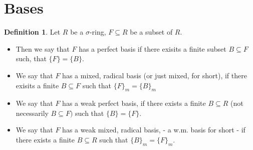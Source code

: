 \documentclass{article}
\def\s{\sigma}
\theoremstyle{definition}
\newtheorem{defn}[Satz]{Definition}
\begin{document}
\section{Bases}
\begin{defn}
Let $R$ be a $\s$-ring, $F \subseteq R$ be a subset of $R$. 
\begin{itemize}
\item Then we say that $F$ has a perfect basis if there exisits a finite subset $B \subseteq F$ such, 
that $\{F\} = \{ B \}$. 
\item We say that $F$ has a mixed, radical basis (or just mixed, for short), if there exisits a finite $B \subseteq F$ such that $\{F\}_m = \{B\}_m$
\item We say that $F$ has a weak perfect basis, if there exists a finite $B \subseteq R$ (not necessarily $B \subseteq F)$ such that $\{B\} = \{F\}$.
\item We say that $F$ has a weak mixed, radical basis, - a w.m. basis for short - if there exists a finite $B \subseteq R$ such that $\{B\}_m = \{F\}_m$.
\end{itemize}
\end{defn}
\end{document}

